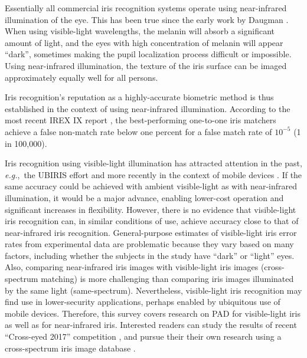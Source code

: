 \documentclass[format=acmsmall, review=false, timestamp=false]{acmart}
\newcommand{\eg}{{\it e.g.},~}
\begin{document}
Essentially all commercial iris recognition systems operate using near-infrared illumination of the eye. This has been true since the early work by Daugman \cite{Daugman_patent_1994}. When using visible-light wavelengths, the melanin will absorb a significant amount of light, and the eyes with high concentration of melanin will appear ``dark'', sometimes making the pupil localization process difficult or impossible. Using near-infrared illumination, the texture of the iris surface can be imaged approximately equally well for all persons.

Iris recognition's reputation as a highly-accurate biometric {method} is thus established in the context of using near-infrared illumination. {According to the most recent IREX IX report \cite{IREX_IX}, the best-performing one-to-one iris matchers achieve a false non-match rate below one percent for a false match rate of $10^{-5}$ (1 in 100,000).}

Iris recognition using visible-light illumination has attracted attention in the past, \eg the UBIRIS effort \cite{UBIRIS_DB_URL} and more recently in the context of mobile devices {\cite{Sequeira_VISAPPb_2014,Trokielewicz_JTIT_2016}}. If the same accuracy could be achieved with ambient visible-light as with near-infrared illumination, it would be a major advance, enabling lower-cost operation and significant increases in flexibility. However, there is no evidence that visible-light iris recognition can, in similar conditions of use, achieve accuracy close to that of near-infrared iris recognition. General-purpose estimates of visible-light iris error rates from experimental data are problematic because they vary based on many factors, including whether the subjects in the study have ``dark'' or ``light'' eyes. {Also, comparing near-infrared iris images with visible-light iris images (cross-spectrum matching) is more challenging than comparing iris images illuminated by the same light (same-spectrum).} Nevertheless, visible-light iris recognition may find use in lower-security applications, perhaps enabled by ubiquitous use of mobile devices. Therefore, this survey covers research on PAD for visible-light iris as well as for near-infrared iris. {Interested readers can study the results of recent ``Cross-eyed 2017'' competition \cite{Sequeira_IJCB_2017}, and pursue their their own research using a cross-spectrum iris image database \cite{Sequeira_VISAPPb_2014}.}



\end{document}

